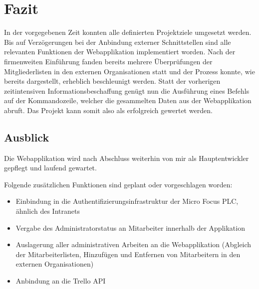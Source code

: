 \section{Fazit}
\label{sec:Fazit}
In der vorgegebenen Zeit konnten alle definierten Projektziele umgesetzt werden. Bis auf
Verzögerungen bei der Anbindung externer Schnittstellen sind alle relevanten Funktionen der
Webapplikation implementiert worden.
Nach der firmenweiten Einführung fanden bereits mehrere Überprüfungen der Mitgliederlisten in den
externen Organisationen statt und der Prozess konnte, wie bereits dargestellt, erheblich beschleunigt werden.
Statt der vorherigen
zeitintensiven Informationsbeschaffung genügt nun die Ausführung eines Befehls auf der Kommandozeile,
welcher die gesammelten Daten aus der Webapplikation abruft. Das Projekt kann somit also als
erfolgreich gewertet werden.

\subsection{Ausblick}
\label{sec:Ausblick}
Die Webapplikation wird nach Abschluss weiterhin von mir als Hauptentwickler gepflegt und laufend
gewartet.

Folgende zusätzlichen Funktionen sind geplant oder vorgeschlagen worden:
\begin{itemize}
  \item Einbindung in die Authentifizierungsinfrastruktur der Micro Focus PLC, ähnlich des
  Intranets
  \item Vergabe des Administratorstatus an Mitarbeiter innerhalb der Applikation
  \item Auslagerung aller administrativen Arbeiten an die Webapplikation (Abgleich der
  Mitarbeiterlisten, Hinzufügen und Entfernen von Mitarbeitern in den externen Organisationen)
  \item Anbindung an die Trello API
\end{itemize}
